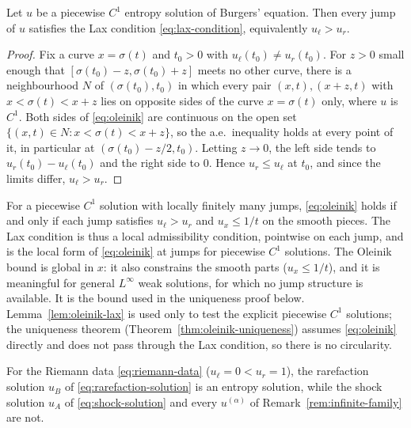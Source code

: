\begin{lemma}
\label{lem:oleinik-lax}
Let $u$ be a piecewise $C^1$ entropy solution of Burgers' equation. Then
every jump of $u$ satisfies the Lax condition \eqref{eq:lax-condition},
equivalently $u_\ell>u_r$.
\end{lemma}

\begin{proof}
Fix a curve $x=\sigma(t)$ and $t_0>0$ with $u_\ell(t_0)\ne u_r(t_0)$. For $z>0$ small
enough that $[\sigma(t_0)-z,\sigma(t_0)+z]$ meets no other curve, there is a
neighbourhood $N$ of $(\sigma(t_0),t_0)$ in which every pair $(x,t),(x+z,t)$ with
$x<\sigma(t)<x+z$ lies on opposite sides of the curve $x=\sigma(t)$ only, where
$u$ is $C^1$. Both sides of \eqref{eq:oleinik} are continuous on the open set
$\{(x,t)\in N: x<\sigma(t)<x+z\}$, so the a.e.\ inequality holds at every point of
it, in particular at $(\sigma(t_0)-z/2,t_0)$. Letting $z\to0$, the left side
tends to $u_r(t_0)-u_\ell(t_0)$ and the right side to $0$. Hence $u_r\le u_\ell$ at
$t_0$, and since the limits differ, $u_\ell>u_r$.
\end{proof}

\begin{remark}
\label{rem:lax-vs-oleinik}
For a piecewise $C^1$ solution with locally finitely many jumps,
\eqref{eq:oleinik} holds if and only if each jump satisfies $u_\ell>u_r$ and
$u_x\le 1/t$ on the smooth pieces. The Lax condition is thus a local admissibility
condition, pointwise on each jump, and is the local form of \eqref{eq:oleinik}
at jumps for piecewise $C^1$ solutions. The Oleinik bound is global in $x$: it
also constrains the smooth parts ($u_x\le1/t$), and it is meaningful for general
$L^\infty$ weak solutions, for which no jump structure is available. It is the
bound used in the uniqueness proof below. Lemma~\ref{lem:oleinik-lax} is used only
to test the explicit piecewise $C^1$ solutions; the uniqueness theorem
(Theorem~\ref{thm:oleinik-uniqueness}) assumes \eqref{eq:oleinik} directly and does
not pass through the Lax condition, so there is no circularity.
\end{remark}

\begin{proposition}
\label{prop:entropy-selects-B}
For the Riemann data \eqref{eq:riemann-data} ($u_\ell=0<u_r=1$), the
rarefaction solution $u_B$ of \eqref{eq:rarefaction-solution} is an
entropy solution, while the shock solution $u_A$ of
\eqref{eq:shock-solution} and every $u^{(\alpha)}$ of
Remark~\ref{rem:infinite-family} are not.
\end{proposition}

